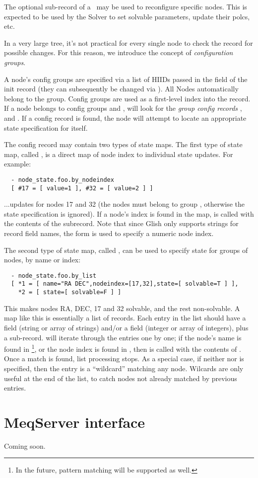 \documentclass[10pt]{article}
\begin{document}
  The optional  sub-record of a \Request\ may be used to
  reconfigure specific nodes. This is expected to be used by the Solver to set
  solvable parameters, update their polcs, etc. 
  
  In a very large tree, it's not practical for every single node to check the
  record for possible changes. For this reason, we introduce the concept of
  {\em configuration groups}. 

  A node's config groups are specified via a list of HIIDs passed in the
   field of the init record (they can subsequently be
  changed via ). All Nodes automatically belong to the 
  group. Config groups are used as a first-level index into the
   record. If a node belongs to config groups  and
  ,  will look for the {\em group config records}\/
  ,  and . If a
  config record is found, the node will attempt to locate an appropriate state
  specification for itself.

  The config record may contain two types of state maps. The first type of
  state map, called , is a direct map of node index to
  individual state updates. For example: 

\begin{verbatim}
  - node_state.foo.by_nodeindex
  [ #17 = [ value=1 ], #32 = [ value=2 ] ]
\end{verbatim}

  ...updates  for nodes 17 and 32 (the nodes must belong to
  group , otherwise the state specification is ignored). If a node's
  index is found in the map,  is called with the contents of the
  subrecord. Note that since Glish only supports strings for record field
  names, the  form is used to specify a numeric node index.

  The second type of state map, called , can be used to specify
  state for groups of nodes, by name or index:

\begin{verbatim}
  - node_state.foo.by_list
  [ *1 = [ name="RA DEC",nodeindex=[17,32],state=[ solvable=T ] ],
    *2 = [ state=[ solvable=F ] ]
\end{verbatim}

  This makes nodes RA, DEC, 17 and 32 solvable, and the rest non-solvable.  A
  map like this is essentially a list of records. Each entry in the list should
  have a  field (string or array of strings) and/or a 
  field (integer or array of integers), plus a  sub-record.
   will iterate through the entries one by one; if the
  node's name is found in \footnote{In the future, pattern matching
  will be supported as well.}, or the node index is found in ,
  then  is called with the contents of . Once a match
  is found, list processing stops. As a special case, if neither  nor
   is specified, then the entry is a ``wildcard'' matching any node.
  Wilcards are only useful at the end of the list, to catch nodes not already
  matched by previous entries.
  
\section{MeqServer interface}

Coming soon.
\end{document}
